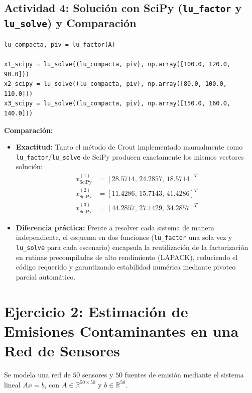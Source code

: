 \documentclass[11pt,a4paper]{article}
\begin{document}
\subsection{Actividad 4: Solución con SciPy (\texttt{lu\_factor} y \texttt{lu\_solve}) y Comparación}
\begin{lstlisting}
lu_compacta, piv = lu_factor(A)

x1_scipy = lu_solve((lu_compacta, piv), np.array([100.0, 120.0, 90.0]))
x2_scipy = lu_solve((lu_compacta, piv), np.array([80.0, 100.0, 110.0]))
x3_scipy = lu_solve((lu_compacta, piv), np.array([150.0, 160.0, 140.0]))
\end{lstlisting}
\textbf{Comparación:}
\begin{itemize}[leftmargin=*]
    \item \textbf{Exactitud:} Tanto el método de Crout implementado manualmente como \texttt{lu\_factor}/\texttt{lu\_solve} de SciPy producen exactamente los mismos vectores solución:
    \begin{align*}
        x^{(1)}_{\text{SciPy}} &= [28.5714, \, 24.2857, \, 18.5714]^T \\
        x^{(2)}_{\text{SciPy}} &= [11.4286, \, 15.7143, \, 41.4286]^T \\
        x^{(3)}_{\text{SciPy}} &= [44.2857, \, 27.1429, \, 34.2857]^T
    \end{align*}
    \item \textbf{Diferencia práctica:} Frente a resolver cada sistema de manera independiente, el esquema en dos funciones (\texttt{lu\_factor} una sola vez y \texttt{lu\_solve} para cada escenario) encapsula la reutilización de la factorización en rutinas precompiladas de alto rendimiento (LAPACK), reduciendo el código requerido y garantizando estabilidad numérica mediante pivoteo parcial automático.
\end{itemize}

\section{Ejercicio 2: Estimación de Emisiones Contaminantes en una Red de Sensores}

Se modela una red de $50$ sensores y $50$ fuentes de emisión mediante el sistema lineal $Ax = b$, con $A \in \mathbb{R}^{50 \times 50}$ y $b \in \mathbb{R}^{50}$.
\end{document}
